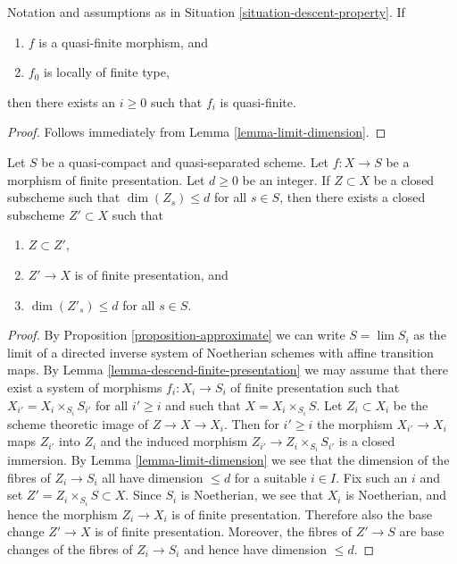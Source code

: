 \begin{lemma}
\label{lemma-descend-quasi-finite}
Notation and assumptions as in Situation \ref{situation-descent-property}.
If
\begin{enumerate}
\item $f$ is a quasi-finite morphism, and
\item $f_0$ is locally of finite type,
\end{enumerate}
then there exists an $i \geq 0$ such that $f_i$ is quasi-finite.
\end{lemma}

\begin{proof}
Follows immediately from Lemma \ref{lemma-limit-dimension}.
\end{proof}

\begin{lemma}
\label{lemma-approximate-given-relative-dimension}
Let $S$ be a quasi-compact and quasi-separated scheme.
Let $f : X \to S$ be a morphism of finite presentation.
Let $d \geq 0$ be an integer.
If $Z \subset X$ be a closed subscheme such that
$\dim(Z_s) \leq d$ for all $s \in S$, then there exists a
closed subscheme $Z' \subset X$ such that
\begin{enumerate}
\item $Z \subset Z'$,
\item $Z' \to X$ is of finite presentation, and
\item $\dim(Z'_s) \leq d$ for all $s \in S$.
\end{enumerate}
\end{lemma}

\begin{proof}
By
Proposition \ref{proposition-approximate}
we can write $S = \lim S_i$ as the limit of a directed inverse
system of Noetherian schemes with affine transition maps. By
Lemma \ref{lemma-descend-finite-presentation}
we may assume that there exist a system of morphisms
$f_i : X_i \to S_i$ of finite presentation such that
$X_{i'} = X_i \times_{S_i} S_{i'}$
for all $i' \geq i$ and such that $X = X_i \times_{S_i} S$.
Let $Z_i \subset X_i$ be the scheme theoretic image of
$Z \to X \to X_i$. Then for $i' \geq i$ the morphism $X_{i'} \to X_i$
maps $Z_{i'}$ into $Z_i$ and the induced morphism
$Z_{i'} \to Z_i \times_{S_i} S_{i'}$ is a closed immersion. By
Lemma \ref{lemma-limit-dimension}
we see that the dimension of the fibres of $Z_i \to S_i$
all have dimension $\leq d$ for a suitable $i \in I$.
Fix such an $i$ and set $Z' = Z_i \times_{S_i} S \subset X$.
Since $S_i$ is Noetherian, we see that $X_i$ is Noetherian, and hence
the morphism $Z_i \to X_i$ is of finite presentation.
Therefore also the base change $Z' \to X$ is of finite presentation.
Moreover, the fibres of $Z' \to S$ are base changes of the fibres
of $Z_i \to S_i$ and hence have dimension $\leq d$.
\end{proof}

